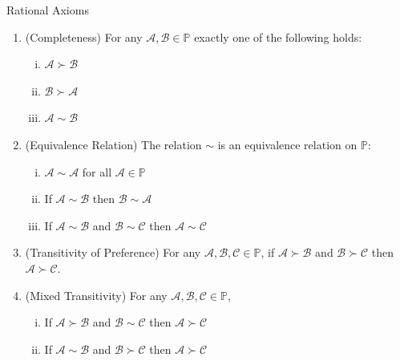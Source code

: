 \documentclass[10pt]{beamer}
\theoremstyle{definition}
\begin{document}
\begin{frame}{Rational Axioms}
  \begin{enumerate}[<+->]
  \item (Completeness)
    For any $\mathcal{A}, \mathcal{B} \in \mathbb{P}$ exactly one of the following holds:
    \vspace{-3mm}
    \begin{multicols}{3}
      \begin{enumerate}[(i)]
        \item $\mathcal{A} \succ \mathcal{B}$
        \item $\mathcal{B} \succ \mathcal{A}$
        \item $\mathcal{A} \sim \mathcal{B}$
      \end{enumerate}
    \end{multicols}
    \vspace{-3mm}

  \item (Equivalence Relation)
    The relation $\sim$ is an equivalence relation on $\mathbb{P}$:
    \vspace{-3mm}
    \begin{multicols}{2}
    \begin{enumerate}[(i)]
      \item $\mathcal{A} \sim \mathcal{A}$ for all $\mathcal{A} \in \mathbb{P}$
      \item If $\mathcal{A} \sim \mathcal{B}$ then $\mathcal{B} \sim \mathcal{A}$
      \item If $\mathcal{A} \sim \mathcal{B}$ and $\mathcal{B} \sim \mathcal{C}$ then $\mathcal{A} \sim \mathcal{C}$
    \end{enumerate}
  \end{multicols}
    \vspace{-3mm}

  \item (Transitivity of Preference)
    For any $\mathcal{A}, \mathcal{B}, \mathcal{C} \in \mathbb{P}$, if $\mathcal{A} \succ \mathcal{B}$ and $\mathcal{B} \succ \mathcal{C}$ then $\mathcal{A} \succ \mathcal{C}$.

  \item (Mixed Transitivity)
    For any $\mathcal{A}, \mathcal{B}, \mathcal{C} \in \mathbb{P}$,
    \begin{enumerate}[(i)]
      \item If $\mathcal{A} \succ \mathcal{B}$ and $\mathcal{B} \sim \mathcal{C}$ then $\mathcal{A} \succ \mathcal{C}$
      \item If $\mathcal{A} \sim \mathcal{B}$ and $\mathcal{B} \succ \mathcal{C}$ then $\mathcal{A} \succ \mathcal{C}$
    \end{enumerate}


\end{enumerate}
\end{frame}
\end{document}
